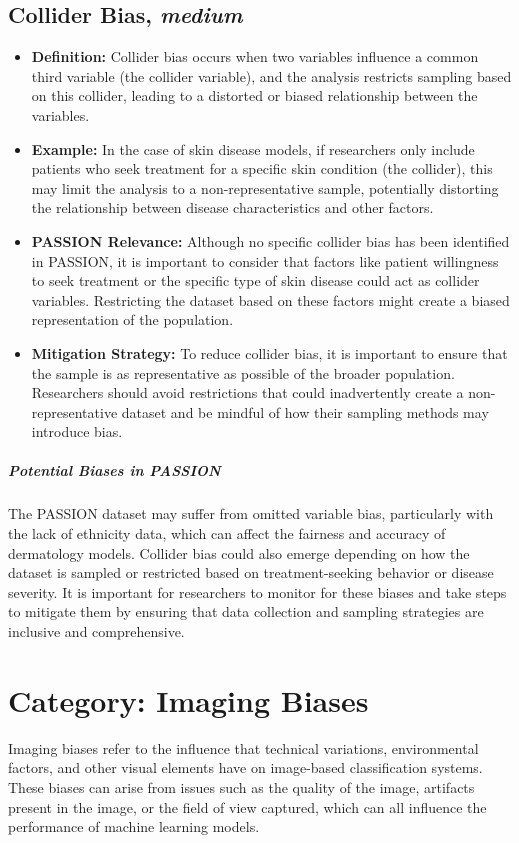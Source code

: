 \begin{refsection}
		\subsection{Collider Bias, \textit{medium}}
		\begin{itemize}
			\item \textbf{Definition:} Collider bias occurs when two variables influence a common third variable (the collider variable), and the analysis restricts sampling based on this collider, leading to a distorted or biased relationship between the variables.
			\item \textbf{Example:} In the case of skin disease models, if researchers only include patients who seek treatment for a specific skin condition (the collider), this may limit the analysis to a non-representative sample, potentially distorting the relationship between disease characteristics and other factors.
			\item \textbf{PASSION Relevance:} Although no specific collider bias has been identified in PASSION, it is important to consider that factors like patient willingness to seek treatment or the specific type of skin disease could act as collider variables. Restricting the dataset based on these factors might create a biased representation of the population.
			\item \textbf{Mitigation Strategy:} To reduce collider bias, it is important to ensure that the sample is as representative as possible of the broader population. Researchers should avoid restrictions that could inadvertently create a non-representative dataset and be mindful of how their sampling methods may introduce bias.
		\end{itemize}
		
		\subparagraph{Potential Biases in PASSION}
		The PASSION dataset may suffer from omitted variable bias, particularly with the lack of ethnicity data, which can affect the fairness and accuracy of dermatology models. Collider bias could also emerge depending on how the dataset is sampled or restricted based on treatment-seeking behavior or disease severity. It is important for researchers to monitor for these biases and take steps to mitigate them by ensuring that data collection and sampling strategies are inclusive and comprehensive.
		
		
		
		\section{\textbf{Category:} Imaging Biases}
		Imaging biases refer to the influence that technical variations, environmental factors, and other visual elements have on image-based classification systems. These biases can arise from issues such as the quality of the image, artifacts present in the image, or the field of view captured, which can all influence the performance of machine learning models.
		

\end{refsection}
